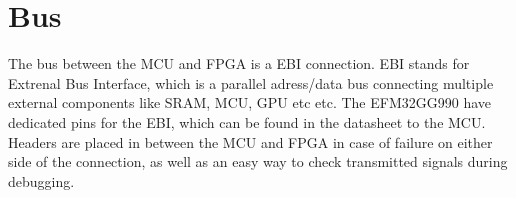 \documentclass[../main/report.tex]{subfiles}
\begin{document}
\section{Bus}
The bus between the MCU and FPGA is a EBI connection.
EBI stands for Extrenal Bus Interface, which is a parallel adress/data bus connecting multiple external components like SRAM, MCU, GPU etc etc.
The EFM32GG990 have dedicated pins for the EBI, which can be found in the datasheet to the MCU.
Headers are placed in between the MCU and FPGA in case of failure on either side of the connection, as well as an easy way to check transmitted signals during debugging.
\end{document}
